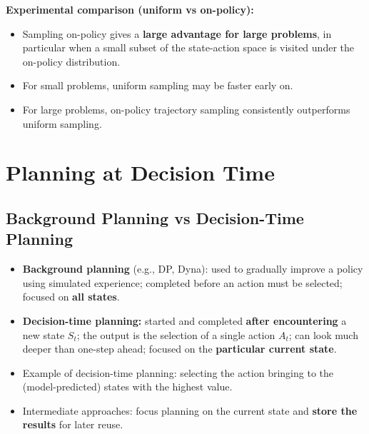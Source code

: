 \documentclass[11pt,a4paper]{article}
\theoremstyle{definition}
\theoremstyle{plain}
\theoremstyle{remark}
\begin{document}
\textbf{Experimental comparison (uniform vs on-policy):}
\begin{itemize}
    \item Sampling on-policy gives a \textbf{large advantage for large problems}, in particular when a small subset of the state-action space is visited under the on-policy distribution.
    \item For small problems, uniform sampling may be faster early on.
    \item For large problems, on-policy trajectory sampling consistently outperforms uniform sampling.
\end{itemize}

\section{Planning at Decision Time}

\subsection{Background Planning vs Decision-Time Planning}

\begin{tcolorbox}[colback=blue!5!white, colframe=blue!60!black, title={Two Modes of Planning}]
\begin{itemize}
    \item \textbf{Background planning} (e.g., DP, Dyna): used to gradually improve a policy using simulated experience; completed before an action must be selected; focused on \textbf{all states}.
    \item \textbf{Decision-time planning:} started and completed \textbf{after encountering} a new state $S_t$; the output is the selection of a single action $A_t$; can look much deeper than one-step ahead; focused on the \textbf{particular current state}.
\end{itemize}
\end{tcolorbox}

\begin{itemize}
    \item Example of decision-time planning: selecting the action bringing to the (model-predicted) states with the highest value.
    \item Intermediate approaches: focus planning on the current state and \textbf{store the results} for later reuse.
\end{itemize}
\end{document}

